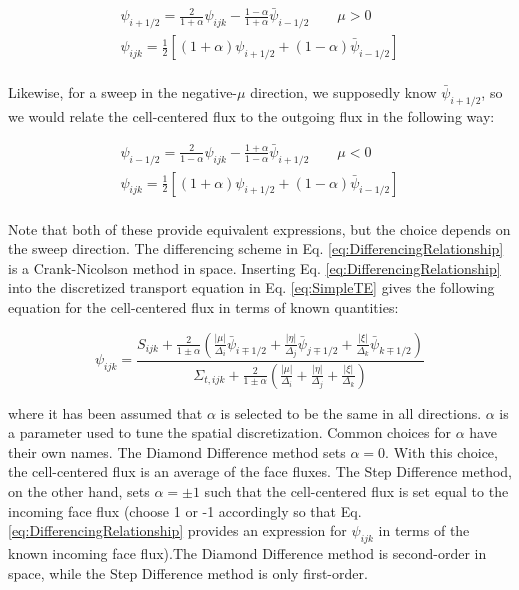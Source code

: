 \documentclass[10pt]{article}
\begin{document}
\begin{flushleft}
\begin{equation}
\begin{aligned}
\psi_{i+1/2}=\frac{2}{1+\alpha}\psi_{ijk}-\frac{1-\alpha}{1+\alpha}\bar{\psi}_{i-1/2}\quad\quad\mu >0\\
\psi_{ijk}=\frac{1}{2}\left\lbrack(1+\alpha)\psi_{i+1/2}+(1-\alpha)\bar{\psi}_{i-1/2}\right\rbrack\\
\end{aligned}
\end{equation}

Likewise, for a sweep in the negative-\(\mu\) direction, we supposedly know \(\bar{\psi}_{i+1/2}\), so we would relate the cell-centered flux to the outgoing flux in the following way:

\begin{equation}
\begin{aligned}
\psi_{i-1/2}=\frac{2}{1-\alpha}\psi_{ijk}-\frac{1+\alpha}{1-\alpha}\bar{\psi}_{i+1/2}\quad\quad\mu <0\\
\psi_{ijk}=\frac{1}{2}\left\lbrack(1+\alpha)\psi_{i+1/2}+(1-\alpha)\bar{\psi}_{i-1/2}\right\rbrack\\
\end{aligned}
\end{equation}

Note that both of these provide equivalent expressions, but the choice depends on the sweep direction. The differencing scheme in Eq. \eqref{eq:DifferencingRelationship} is a Crank-Nicolson method in space. Inserting Eq. \eqref{eq:DifferencingRelationship} into the discretized transport equation in Eq. \eqref{eq:SimpleTE} gives the following equation for the cell-centered flux in terms of known quantities:

\begin{equation}
\label{eq:psi_ijk}
\psi_{ijk}=\frac{S_{ijk}+\frac{2}{1\pm\alpha}\left(\frac{|\mu|}{\Delta_i}\bar{\psi}_{i\mp1/2}+\frac{|\eta|}{\Delta_j}\bar{\psi}_{j\mp1/2}+\frac{|\xi|}{\Delta_k}\bar{\psi}_{k\mp1/2}\right)}{\Sigma_{t,ijk}+\frac{2}{1\pm\alpha}\left(\frac{|\mu|}{\Delta_i}+\frac{|\eta|}{\Delta_j}+\frac{|\xi|}{\Delta_k}\right)}
\end{equation}

where it has been assumed that \(\alpha\) is selected to be the same in all directions. \(\alpha\) is a parameter used to tune the spatial discretization. Common choices for \(\alpha\) have their own names. The Diamond Difference method sets \(\alpha=0\). With this choice, the cell-centered flux is an average of the face fluxes. The Step Difference method, on the other hand, sets \(\alpha=\pm1\) such that the cell-centered flux is set equal to the incoming face flux (choose 1 or -1 accordingly so that Eq. \eqref{eq:DifferencingRelationship} provides an expression for \(\psi_{ijk}\) in terms of the known incoming face flux).The Diamond Difference method is second-order in space, while the Step Difference method is only first-order. 


\end{flushleft}
\end{document}
